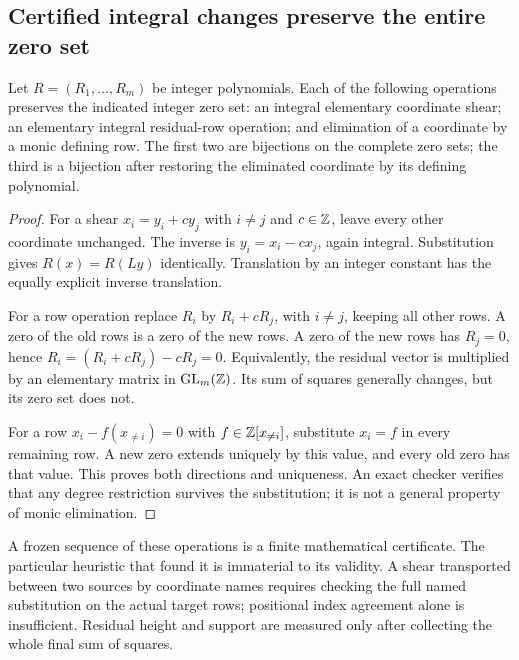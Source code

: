 \subsection{Certified integral changes preserve the entire zero set}
\begin{lemma}\label{lem:elementary}
Let $R=(R_1,\ldots,R_m)$ be integer polynomials. Each of the following
operations preserves the indicated integer zero set: an integral elementary
coordinate shear; an elementary integral residual-row operation; and
elimination of a coordinate by a monic defining row. The first two are
bijections on the complete zero sets; the third is a bijection after restoring
the eliminated coordinate by its defining polynomial.
\end{lemma}
\begin{proof}
For a shear $x_i=y_i+c y_j$ with $i\ne j$ and $c\in\mathbb Z$, leave every
other coordinate unchanged. The inverse is $y_i=x_i-cx_j$, again integral.
Substitution gives $R(x)=R(Ly)$ identically. Translation by an integer
constant has the equally explicit inverse translation.

For a row operation replace $R_i$ by $R_i+cR_j$, with $i\ne j$, keeping
all other rows. A zero of the old rows is a zero of the new rows. A zero of
the new rows has $R_j=0$, hence $R_i=(R_i+cR_j)-cR_j=0$. Equivalently,
the residual vector is multiplied by an elementary matrix in
$\operatorname{GL}_m(\mathbb Z)$. Its sum of squares generally changes, but its
zero set does not.

For a row $x_i-f(x_{\ne i})=0$ with $f\in\mathbb Z[x_{\ne i}]$, substitute
$x_i=f$ in every remaining row. A new zero extends uniquely by this value,
and every old zero has that value. This proves both directions and
uniqueness. An exact checker verifies that any degree restriction survives
the substitution; it is not a general property of monic elimination.
\end{proof}
A frozen sequence of these operations is a finite mathematical certificate.
The particular heuristic that found it is immaterial to its validity.
A shear transported between two sources by coordinate names requires
checking the full named substitution on the actual target rows; positional
index agreement alone is insufficient. Residual height and support are
measured only after collecting the whole final sum of squares.


